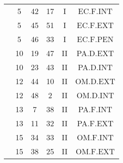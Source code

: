 \documentclass[12pt, a4paper]{article}
\begin{document}
\begin{multicols}{3}
{\begin{tabular}{c c c c c c}
	 	 	 	 & 5 & 42 & 17 & I & EC.F.INT\\%
	 	 	 	 & 5 & 45 & 51 & I & EC.F.EXT\\%
	 	 	 	 & 5 & 46 & 33 & I & EC.F.PEN\\%
	 	 	 	 & 10 & 19 & 47 & II & PA.D.EXT\\%
	 	 	 	 & 10 & 23 & 43 & II & PA.D.INT\\%
	 	 	 	 & 12 & 44 & 10 & II & OM.D.EXT\\%
	 	 	 	 & 12 & 48 & 2 & II & OM.D.INT\\%
	 	 	 	 & 13 & 7 & 38 & II & PA.F.INT\\%
	 	 	 	 & 13 & 11 & 32 & II & PA.F.EXT\\%
	 	 	 	 & 15 & 34 & 33 & II & OM.F.INT\\%
	 	 	 	 & 15 & 38 & 25 & II & OM.F.EXT\\%
	 	 \end{tabular}
 	}
\end{multicols}
\end{document}
